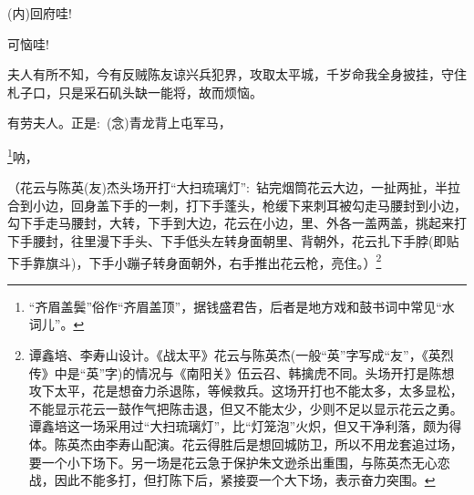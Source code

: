 \newpage
\subsubsection{\large{}}

{\vspace{5pt}}

{({\akai 内})回府哇!}

{可恼哇!}

{夫人有所不知，今有反贼}陈友谅兴兵犯界，攻取太平城，千岁命我全身披挂，守住札子口，只是采石矶头缺一能将，故而烦恼。

有劳夫人。正是:~({\akai 念})青龙背上屯军马，

\footnote{``齐眉盖鬓''俗作``齐眉盖顶''，据钱盛君告，后者是地方戏和鼓书词中常见``水词儿''。}{呐，}




{\vspace{5pt}}


（{花云与陈英(友)杰头场开打``大扫琉璃灯''}:~钻完烟筒花云大边，一扯两扯，半拉合到小边，回身盖下手的一刺，打下手蓬头，枪缓下来刺耳被勾走马腰封到小边，勾下手走马腰封，大转，下手到大边，花云在小边，里、外各一盖两盖，挑起来打下手腰封，往里漫下手头、下手低头左转身面朝里、背朝外，花云扎下手脖(即贴下手靠旗斗)，下手小蹦子转身面朝外，右手推出花云枪，亮住。）\footnote{谭鑫培、李寿山设计。《战太平》花云与陈英杰(一般``英''字写成``友''，《英烈传》中是``英''字)的情况与《南阳关》伍云召、韩擒虎不同。头场开打是陈想攻下太平，花是想奋力杀退陈，等候救兵。这场开打也不能太多，太多显松，不能显示花云一鼓作气把陈击退，但又不能太少，少则不足以显示花云之勇。谭鑫培这一场采用过``大扫琉璃灯''，比``灯笼泡''火炽，但又干净利落，颇为得体。陈英杰由李寿山配演。花云得胜后是想回城防卫，所以不用龙套追过场，要一个小下场下。另一场是花云急于保护朱文逊杀出重围，与陈英杰无心恋战，因此不能多打，但打陈下后，紧接耍一个大下场，表示奋力突围。}

